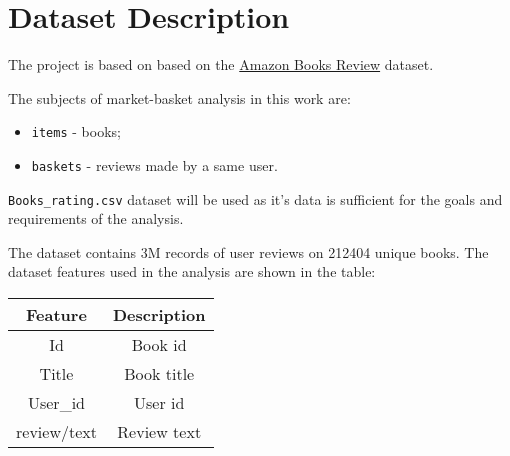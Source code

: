 % 
% 
\chapter{Dataset Description}
\label{chap:dataset_description}
	
The project is based on based on the  \href{https://www.kaggle.com/datasets/mohamedbakhet/amazon-books-reviews}{Amazon Books Review} dataset.

The subjects of market-basket analysis in this work are:

\begin{itemize}
	\item \texttt{items} - books;
	\item \texttt{baskets} - reviews made by a same user.
\end{itemize}

\texttt{Books\_rating.csv} dataset will be used as it's data is sufficient for the goals and requirements of the analysis.

The dataset contains 3M records of user reviews on 212404 unique books.
The dataset features used in the analysis are shown in the table:
\begin{center}
\begin{tabular}{ |c|c| }
	\hline
		Feature & Description \\ [0.5ex] 
	\hline
	 	Id & Book id \\
	 	Title & Book title \\
		User\_id & User id \\
		review/text & Review text \\
	\hline
\end{tabular}
\end{center}



